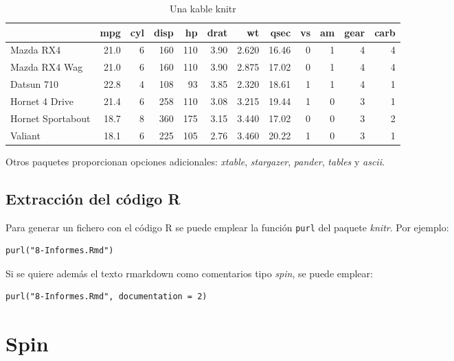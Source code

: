 \documentclass[
]{book}
\theoremstyle{break}
\begin{document}
\begin{table}

\caption{\label{tab:kable}Una kable knitr}
\centering
\begin{tabular}[t]{l|r|r|r|r|r|r|r|r|r|r|r}
\hline
  & mpg & cyl & disp & hp & drat & wt & qsec & vs & am & gear & carb\\
\hline
Mazda RX4 & 21.0 & 6 & 160 & 110 & 3.90 & 2.620 & 16.46 & 0 & 1 & 4 & 4\\
\hline
Mazda RX4 Wag & 21.0 & 6 & 160 & 110 & 3.90 & 2.875 & 17.02 & 0 & 1 & 4 & 4\\
\hline
Datsun 710 & 22.8 & 4 & 108 & 93 & 3.85 & 2.320 & 18.61 & 1 & 1 & 4 & 1\\
\hline
Hornet 4 Drive & 21.4 & 6 & 258 & 110 & 3.08 & 3.215 & 19.44 & 1 & 0 & 3 & 1\\
\hline
Hornet Sportabout & 18.7 & 8 & 360 & 175 & 3.15 & 3.440 & 17.02 & 0 & 0 & 3 & 2\\
\hline
Valiant & 18.1 & 6 & 225 & 105 & 2.76 & 3.460 & 20.22 & 1 & 0 & 3 & 1\\
\hline
\end{tabular}
\end{table}

Otros paquetes proporcionan opciones adicionales: \emph{xtable}, \emph{stargazer}, \emph{pander}, \emph{tables} y \emph{ascii}.

\hypertarget{extracciuxf3n-del-cuxf3digo-r}{%
\subsection{Extracción del código R}\label{extracciuxf3n-del-cuxf3digo-r}}

Para generar un fichero con el código R se puede emplear la función \texttt{purl} del paquete \emph{knitr}. Por ejemplo:

\begin{verbatim}
purl("8-Informes.Rmd")
\end{verbatim}

Si se quiere además el texto rmarkdown como comentarios tipo \emph{spin}, se puede emplear:

\begin{verbatim}
purl("8-Informes.Rmd", documentation = 2)
\end{verbatim}

\hypertarget{spin}{%
\section{Spin}\label{spin}}
\end{document}

